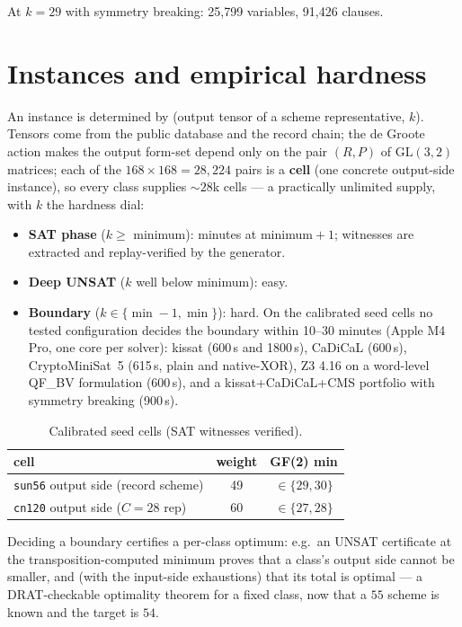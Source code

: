 \documentclass[conference]{IEEEtran}
\begin{document}
At $k=29$ with symmetry breaking: 25{,}799 variables, 91{,}426
clauses.

\section{Instances and empirical hardness}\label{sec:inst}

An instance is determined by (output tensor of a scheme
representative, $k$). Tensors come from the public database and the
record chain; the de Groote action makes the output form-set depend only on the
pair $(R,P)$ of $\mathrm{GL}(3,2)$ matrices; each of the
$168\times168 = 28{,}224$ pairs is a \textbf{cell} (one concrete
output-side instance), so every class supplies ${\sim}28$k cells
--- a practically unlimited supply, with $k$ the hardness dial:

\begin{itemize}
\item \textbf{SAT phase} ($k \ge$ minimum): minutes at
  minimum${}+1$; witnesses are extracted and replay-verified by the
  generator.
\item \textbf{Deep UNSAT} ($k$ well below minimum): easy.
\item \textbf{Boundary} ($k \in \{\min-1, \min\}$): hard. On the
  calibrated seed cells no tested configuration decides the
  boundary within 10--30 minutes (Apple M4 Pro, one core per
  solver): kissat (600\,s and 1800\,s), CaDiCaL (600\,s),
  CryptoMiniSat~5 (615\,s, plain and native-XOR), Z3 4.16 on a
  word-level QF\_BV formulation (600\,s), and a
  kissat{+}CaDiCaL{+}CMS portfolio with symmetry breaking (900\,s).
\end{itemize}

\begin{table}[h]
\centering
\caption{Calibrated seed cells (SAT witnesses verified).}
{\small
\begin{tabular}{lcc}
\toprule
cell & weight & GF(2) min \\
\midrule
\texttt{sun56} output side (record scheme) & 49 & $\in \{29, 30\}$ \\
\texttt{cn120} output side ($C{=}28$ rep) & 60 & $\in \{27, 28\}$ \\
\bottomrule
\end{tabular}}
\end{table}

Deciding a boundary certifies a per-class optimum: e.g.\ an UNSAT
certificate at the transposition-computed minimum proves that a
class's output side cannot be smaller, and (with the input-side
exhaustions) that its total is optimal --- a DRAT-checkable optimality
theorem for a fixed class, now that a $55$ scheme is known and the
target is $54$.
\end{document}
